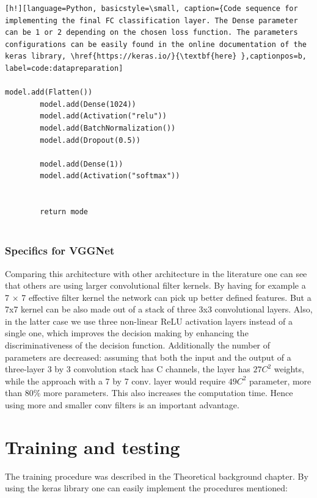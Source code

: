 \documentclass[12pt,a4paper,twoside]{report}
\begin{document}
\begin{lstlisting}[h!][language=Python, basicstyle=\small, caption={Code sequence for implementing the final FC classification layer. The Dense parameter can be 1 or 2 depending on the chosen loss function. The parameters configurations can be easily found in the online documentation of the keras library, \href{https://keras.io/}{\textbf{here} },captionpos=b, label=code:datapreparation]

model.add(Flatten())
		model.add(Dense(1024))
		model.add(Activation("relu"))
		model.add(BatchNormalization())
		model.add(Dropout(0.5))
 
		model.add(Dense(1))
		model.add(Activation("softmax"))
 

		return mode
 
\end{lstlisting}



\subsubsection{Specifics for VGGNet}
Comparing this architecture with other architecture in the literature one can see that others are using larger convolutional filter kernels. By having for example a 7 × 7 effective filter kernel the network can pick up better defined features. But a 7x7 kernel can be also made out of a stack of three 3x3 convolutional layers. Also, in the latter case we use three non-linear ReLU activation layers instead of a single one, which improves the decision making by enhancing the discriminativeness of the decision function. Additionally the number of parameters are decreased: assuming that both the input and the output of a
three-layer 3 by 3 convolution stack has C channels, the layer has $27C^{2}$ weights, while the approach with a 7 by 7 conv. layer would require $49C^{2}$ parameter, more than 80\% more parameters. This also increases the computation time. Hence using more and smaller conv filters is an important advantage.



 
    
\section{Training and testing}
The training procedure was described in the Theoretical background chapter. By using the keras library one can easily implement the procedures mentioned:
\end{document}
